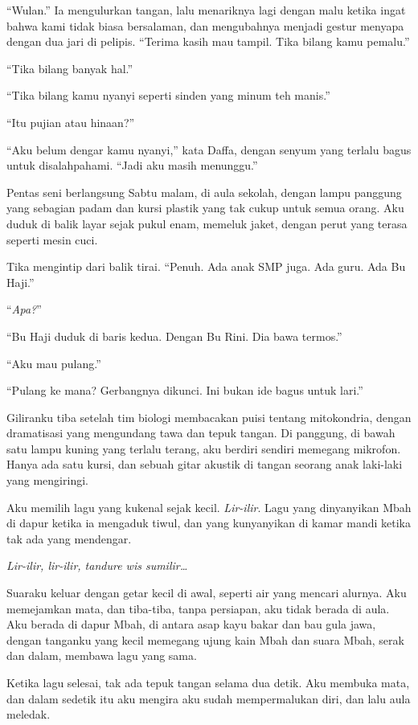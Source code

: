 \documentclass[11pt,twoside,openany]{book}
\makeatletter
\newcommand{\scenebreak}{\par\vspace{0.9em}{\centering\textsc{*\hspace{0.7em}*\hspace{0.7em}*}\par}\vspace{0.9em}\@afterindentfalse\@afterheading}
\makeatother
\begin{document}
``Wulan.'' Ia mengulurkan tangan, lalu menariknya lagi dengan malu ketika ingat bahwa kami tidak biasa bersalaman, dan mengubahnya menjadi gestur menyapa dengan dua jari di pelipis. ``Terima kasih mau tampil. Tika bilang kamu pemalu.''

``Tika bilang banyak hal.''

``Tika bilang kamu nyanyi seperti sinden yang minum teh manis.''

``Itu pujian atau hinaan?''

``Aku belum dengar kamu nyanyi,'' kata Daffa, dengan senyum yang terlalu bagus untuk disalahpahami. ``Jadi aku masih menunggu.''

\scenebreak
Pentas seni berlangsung Sabtu malam, di aula sekolah, dengan lampu panggung yang sebagian padam dan kursi plastik yang tak cukup untuk semua orang. Aku duduk di balik layar sejak pukul enam, memeluk jaket, dengan perut yang terasa seperti mesin cuci.

Tika mengintip dari balik tirai. ``Penuh. Ada anak SMP juga. Ada guru. Ada Bu Haji.''

``\emph{Apa?}''

``Bu Haji duduk di baris kedua. Dengan Bu Rini. Dia bawa termos.''

``Aku mau pulang.''

``Pulang ke mana? Gerbangnya dikunci. Ini bukan ide bagus untuk lari.''

Giliranku tiba setelah tim biologi membacakan puisi tentang mitokondria, dengan dramatisasi yang mengundang tawa dan tepuk tangan. Di panggung, di bawah satu lampu kuning yang terlalu terang, aku berdiri sendiri memegang mikrofon. Hanya ada satu kursi, dan sebuah gitar akustik di tangan seorang anak laki-laki yang mengiringi.

Aku memilih lagu yang kukenal sejak kecil. \emph{Lir-ilir}. Lagu yang dinyanyikan Mbah di dapur ketika ia mengaduk tiwul, dan yang kunyanyikan di kamar mandi ketika tak ada yang mendengar.

\emph{Lir-ilir, lir-ilir, tandure wis sumilir\ldots{}}

Suaraku keluar dengan getar kecil di awal, seperti air yang mencari alurnya. Aku memejamkan mata, dan tiba-tiba, tanpa persiapan, aku tidak berada di aula. Aku berada di dapur Mbah, di antara asap kayu bakar dan bau gula jawa, dengan tanganku yang kecil memegang ujung kain Mbah dan suara Mbah, serak dan dalam, membawa lagu yang sama.

Ketika lagu selesai, tak ada tepuk tangan selama dua detik. Aku membuka mata, dan dalam sedetik itu aku mengira aku sudah mempermalukan diri, dan lalu aula meledak.
\end{document}
